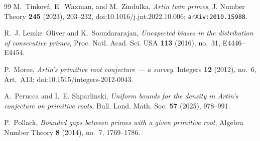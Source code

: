 \documentclass[11pt]{amsart}
\theoremstyle{definition}
\begin{document}
\begin{thebibliography}{99}
	M.~Tinkov\'a, E.~Waxman, and M.~Zindulka,
	\emph{Artin twin primes},
	J. Number Theory \textbf{245} (2023), 203--232,
	doi:10.1016/j.jnt.2022.10.006;
	\texttt{arXiv:2010.15988}.

	R.~J. Lemke~Oliver and K.~Soundararajan,
	\emph{Unexpected biases in the distribution of consecutive primes},
	Proc. Natl. Acad. Sci. USA \textbf{113} (2016), no.~31, E4446--E4454.

	P.~Moree,
	\emph{Artin's primitive root conjecture --- a survey},
	Integers \textbf{12} (2012), no.~6, Art.~A13;
	doi:10.1515/integers-2012-0043.

	A.~Perucca and I.~E. Shparlinski,
	\emph{Uniform bounds for the density in Artin's conjecture on primitive roots},
	Bull. Lond. Math. Soc. \textbf{57} (2025), 978--991.

	P.~Pollack,
	\emph{Bounded gaps between primes with a given primitive root},
	Algebra Number Theory \textbf{8} (2014), no.~7, 1769--1786.

\end{thebibliography}
\end{document}
